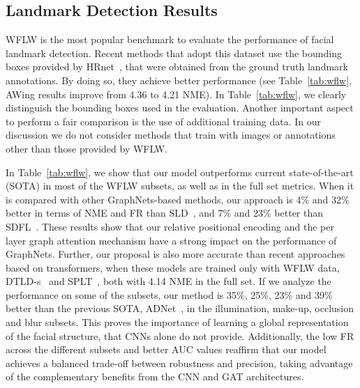 \documentclass{bmvc2k}
\begin{document}
\subsection{Landmark Detection Results}
\label{landmars_sota}

WFLW is the most popular benchmark to evaluate the performance of facial landmark detection. Recent methods that adopt this dataset use the bounding boxes provided by HRnet~\cite{Wang21hrnet}, that were obtained from the ground truth landmark annotations.
By doing so, they achieve better performance (see  Table~\ref{tab:wflw}, AWing results improve from 4.36 to 4.21 NME). In Table~\ref{tab:wflw}, we clearly distinguish the bounding boxes used in the evaluation. Another important aspect to perform a fair comparison is the use of additional training data. 
In our discussion we do not consider methods that train with images or annotations other than those provided by WFLW. 

In Table~\ref{tab:wflw}, we show that our model outperforms current state-of-the-art (SOTA) in most of the WFLW subsets, as well as in the full set metrics. When it is compared with other GraphNets-based methods, our approach is 4\% and 32\% better in terms of NME and FR than  SLD~\cite{Li20sld}, and 7\% and 23\% better than SDFL~\cite{LinTIP21}. These results show that our relative positional encoding and the per layer graph attention mechanism have a strong impact on the performance of GraphNets. Further, our proposal is also more accurate than recent approaches based on transformers, when these models are trained only with WFLW data,  DTLD-s~\cite{Li22casctransf} and SPLT~\cite{Xia22slpt}, both with 4.14 NME in the full set. 
If we analyze the performance on some of the subsets, our method is 35\%, 25\%, 23\% and 39\% better than the previous SOTA, ADNet~\cite{Huang21ADnet}, in the illumination, make-up, occlusion and blur subsets. This proves the importance of learning a global representation of the facial structure, that CNNs alone do not provide.
Additionally, the low FR across the different subsets and better AUC values reaffirm that our model achieves a balanced trade-off between robustness and precision,  taking advantage of the complementary benefits from the CNN and GAT architectures.
\end{document}
